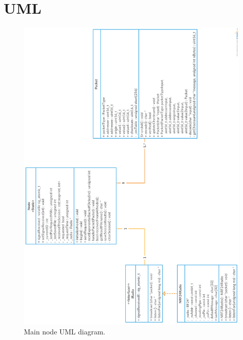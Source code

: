 \chapter{UML} \label{cha:fulluml}
\begin{figure}[h!]
\centering
\includegraphics[width=1.1\textwidth]{chapters/appendix/MainNode_UML.png}
\caption{Main node UML diagram.}
\label{fig:mainuml}
\end{figure}
\clearpage
\addtolength{\topmargin}{-.885in}
\addtolength{\topmargin}{-.875in}

